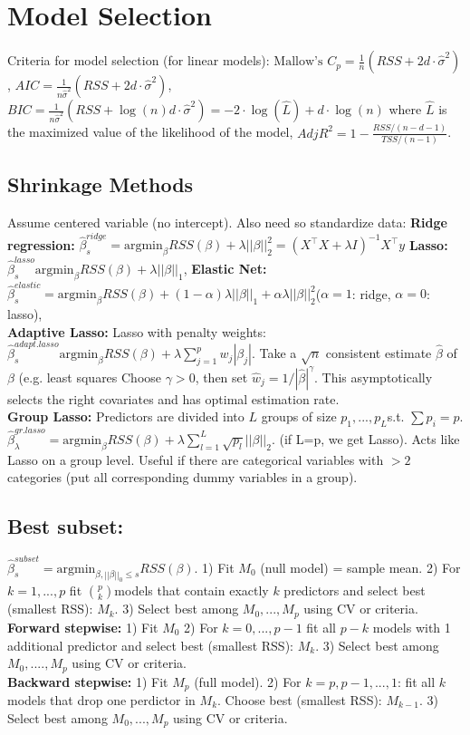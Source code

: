 \section*{Model Selection}
Criteria for model selection (for linear models): $\text{Mallow's }C_p=\frac 1 n (RSS + 2d\cdot \hat\sigma^2)$, $AIC = \frac{1}{n\hat\sigma^2}(RSS+2d\cdot\hat\sigma^2)$, $BIC= \frac{1}{n\hat\sigma^2}(RSS+\log(n)d\cdot\hat\sigma^2) = -2 \cdot\log(\hat L) + d\cdot\log(n)$ where $\hat L$ is the maximized value of the likelihood of the model, $AdjR^2=1-\frac{RSS / (n-d-1)}{TSS / (n-1)}$.

\subsection*{Shrinkage Methods}
Assume centered variable (no intercept). Also need so standardize data:
\textbf{Ridge regression:} $\hat\beta_s^{ridge} = \text{argmin}_\beta RSS(\beta) + \lambda ||\beta||_2^2 = (X^\top X + \lambda I)^{-1}X^\top y$
\textbf{Lasso:} $\hat\beta_s^{lasso}\text{argmin}_\beta RSS(\beta) + \lambda ||\beta||_1$,
\textbf{Elastic Net:} $\hat\beta_s^{elastic} = \text{argmin}_\beta RSS(\beta)+(1-\alpha)\lambda||\beta||_1 + \alpha \lambda ||\beta||_2^2$($\alpha=1$: ridge, $\alpha=0$: lasso),\\
\textbf{Adaptive Lasso:} Lasso with penalty weights: \\
$\hat\beta_s^{adapt.lasso}\text{argmin}_\beta RSS(\beta) + \lambda \sum_{j=1}^p w_j |\beta_j|$. Take a $\sqrt{n}$ consistent estimate $\hat\beta$ of $\beta$ (e.g. least squares Choose $\gamma>0$, then set $\hat w_j = {1}/{|\hat\beta|^\gamma}$. This asymptotically selects the right covariates and has optimal estimation rate.\\
\textbf{Group Lasso:} Predictors are divided into $L$ groups of size $p_1, ..., p_L$s.t. $\sum p_i = p$. $\hat\beta_\lambda^{gr.lasso}=\text{argmin}_\beta RSS(\beta)+\lambda \sum_{l=1}^L \sqrt{p_l} ||\beta||_2$. (if L=p, we get Lasso). Acts like Lasso on a group level. Useful if there are categorical variables with $>2$ categories (put all corresponding dummy variables in a group).\\
\subsection*{Best subset:} $\hat\beta_s^{subset} = \text{argmin}_{\beta, ||\beta||_0 \leq s} RSS(\beta)$. 1) Fit $M_0$ (null model) = sample mean. 2) For $k=1,...,p$ fit $\binom p k$models that contain exactly $k$ predictors and select best (smallest RSS): $M_k$. 3) Select best among $M_0, ..., M_p$ using CV or criteria.\\
\textbf{Forward stepwise:} 1) Fit $M_0$ 2) For $k=0,...,p-1$ fit all $p-k$ models with 1 additional predictor and select best (smallest RSS): $M_k$. 3) Select best among $M_0,....,M_p$ using CV or criteria. \\
\textbf{Backward stepwise:} 1) Fit $M_p$ (full model). 2) For $k=p,p-1,...,1$: fit all $k$ models that drop one perdictor in $M_k$. Choose best (smallest RSS): $M_{k-1}$. 3) Select best among $M_0,...,M_p$ using CV or criteria.

